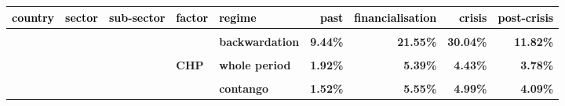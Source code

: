 \documentclass[
  authoryear,
  preprint,
  3p]{elsarticle}
\begin{document}
\begin{landscape}
\begin{longtable}[t]{>{}l>{}l>{}l>{}l>{}l>{}r>{}r>{}r>{}r}
\toprule
\textcolor{black}{\textbf{country}} & \textcolor{black}{\textbf{sector}} & \textcolor{black}{\textbf{sub-sector}} & \textcolor{black}{\textbf{factor}} & \textcolor{black}{\textbf{regime}} & \textcolor{black}{\textbf{past}} & \textcolor{black}{\textbf{financialisation}} & \textcolor{black}{\textbf{crisis}} & \textcolor{black}{\textbf{post-crisis}}\\
\midrule
\textbf{\cellcolor{gray!10}{all}} & \textbf{\cellcolor{gray!10}{all}} & \textbf{\cellcolor{gray!10}{all}} & \textbf{\cellcolor{gray!10}{market}} & \textbf{\cellcolor{gray!10}{whole period}} & \textcolor[HTML]{4285f4}{\textbf{\cellcolor{gray!10}{9.69\%}}} & \textcolor[HTML]{4285f4}{\textbf{\cellcolor{gray!10}{19.7\%}}} & \textcolor[HTML]{4285f4}{\textbf{\cellcolor{gray!10}{31.3\%}}} & \textcolor[HTML]{4285f4}{\textbf{\cellcolor{gray!10}{14.73\%}}}\\
\textbf{} & \textbf{} & \textbf{} & \textbf{} & \textbf{backwardation} & \textcolor[HTML]{4285f4}{\textbf{9.44\%}} & \textcolor[HTML]{4285f4}{\textbf{21.55\%}} & \textcolor[HTML]{4285f4}{\textbf{30.04\%}} & \textcolor[HTML]{4285f4}{\textbf{11.82\%}}\\
\textbf{\cellcolor{gray!10}{}} & \textbf{\cellcolor{gray!10}{}} & \textbf{\cellcolor{gray!10}{}} & \textbf{\cellcolor{gray!10}{}} & \textbf{\cellcolor{gray!10}{contango}} & \textcolor[HTML]{4285f4}{\textbf{\cellcolor{gray!10}{10.07\%}}} & \textcolor[HTML]{4285f4}{\textbf{\cellcolor{gray!10}{18.15\%}}} & \textcolor[HTML]{4285f4}{\textbf{\cellcolor{gray!10}{32.67\%}}} & \textcolor[HTML]{4285f4}{\textbf{\cellcolor{gray!10}{16.99\%}}}\\
\textbf{} & \textbf{} & \textbf{} & \textbf{CHP} & \textbf{whole period} & \textcolor[HTML]{4285f4}{\textbf{1.92\%}} & \textcolor[HTML]{4285f4}{\textbf{5.39\%}} & \textcolor[HTML]{4285f4}{\textbf{4.43\%}} & \textcolor[HTML]{4285f4}{\textbf{3.78\%}}\\
\textbf{\cellcolor{gray!10}{}} & \textbf{\cellcolor{gray!10}{}} & \textbf{\cellcolor{gray!10}{}} & \textbf{\cellcolor{gray!10}{}} & \textbf{\cellcolor{gray!10}{backwardation}} & \textcolor[HTML]{4285f4}{\textbf{\cellcolor{gray!10}{2.6\%}}} & \textcolor[HTML]{4285f4}{\textbf{\cellcolor{gray!10}{5.61\%}}} & \textcolor[HTML]{4285f4}{\textbf{\cellcolor{gray!10}{4\%}}} & \textcolor[HTML]{4285f4}{\textbf{\cellcolor{gray!10}{4.57\%}}}\\
\addlinespace
\textbf{} & \textbf{} & \textbf{} & \textbf{} & \textbf{contango} & \textcolor[HTML]{4285f4}{\textbf{1.52\%}} & \textcolor[HTML]{4285f4}{\textbf{5.55\%}} & \textcolor[HTML]{4285f4}{\textbf{4.99\%}} & \textcolor[HTML]{4285f4}{\textbf{4.09\%}}\\

\end{longtable}
\end{landscape}
\end{document}
